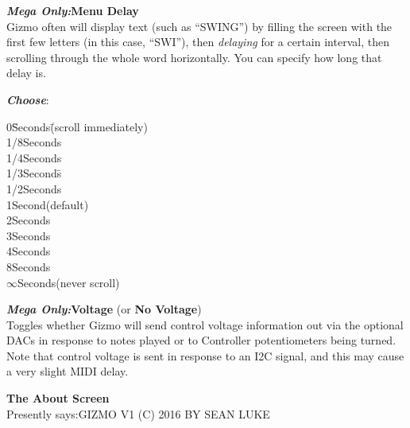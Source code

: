 \documentclass{article}
\begin{document}
\begin{description}
		
	\item{\bf \textit{Mega Only:}\quad Menu Delay}\\
		Gizmo often will display text (such as ``SWING'') by filling the screen with the first few letters (in this case, ``SWI''), then {\it delaying} for a certain interval, then scrolling through the whole word horizontally. You can specify how long that delay is.
		\begin{description}
			\item{\bf \textit{Choose}}:
			\begin{tabbing}
			0\hspace{2em}\=Seconds\hspace{1in}\=(scroll immediately)\\
			1/8\>Seconds\\
			1/4\>Seconds\\
			1/3\>Seconds\>\hspace{1.5in}\=\\
			1/2\>Seconds\\
			1\>Second\>(default)\\
			2\>Seconds\\
			3\>Seconds\\
			4\>Seconds\\
			8\>Seconds\\
			\(\infty\)\>Seconds\>(never scroll)\>\\
			\end{tabbing}
		\end{description}


	\item{\bf \textit{Mega Only:}\quad Voltage} (or {\bf No Voltage})\\
		Toggles whether Gizmo will send control voltage information out via the optional DACs in response to notes played or to Controller potentiometers being turned.  Note that control voltage is sent in response to an I2C signal, and this may cause a very slight MIDI delay.
		
	\item{\bf The About Screen}\\
		Presently says:\quad GIZMO V1 (C) 2016 BY SEAN LUKE
	\end{description}
\end{document}
